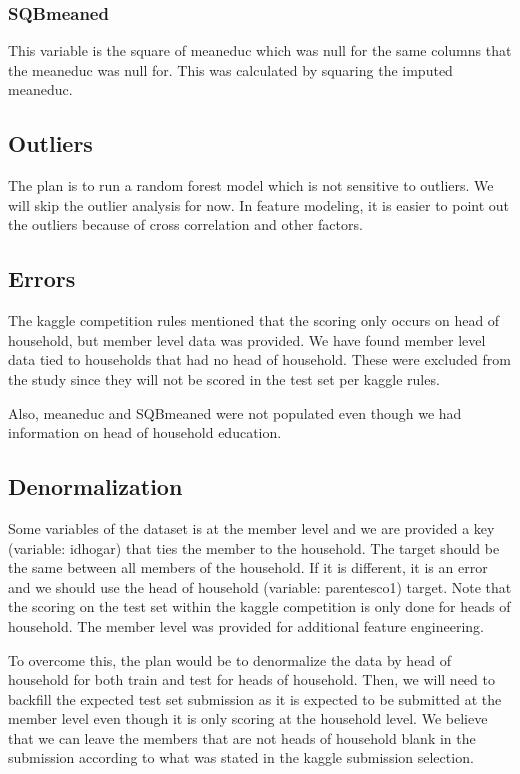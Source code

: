 \documentclass[11pt]{article}
\begin{document}
\subsubsection{SQBmeaned}\label{sqbmeaned}

This variable is the square of meaneduc which was null for the same
columns that the meaneduc was null for. This was calculated by squaring
the imputed meaneduc.

\subsection{Outliers}\label{outliers}

The plan is to run a random forest model which is not sensitive to
outliers. We will skip the outlier analysis for now. In feature
modeling, it is easier to point out the outliers because of cross
correlation and other factors.

\subsection{Errors}\label{errors}

The kaggle competition rules mentioned that the scoring only occurs on
head of household, but member level data was provided. We have found
member level data tied to households that had no head of household.
These were excluded from the study since they will not be scored in the
test set per kaggle rules.

Also, meaneduc and SQBmeaned were not populated even though we had
information on head of household education.

\subsection{Denormalization}\label{denormalization}

Some variables of the dataset is at the member level and we are provided
a key (variable: idhogar) that ties the member to the household. The
target should be the same between all members of the household. If it is
different, it is an error and we should use the head of household
(variable: parentesco1) target. Note that the scoring on the test set
within the kaggle competition is only done for heads of household. The
member level was provided for additional feature engineering.

To overcome this, the plan would be to denormalize the data by head of
household for both train and test for heads of household. Then, we will
need to backfill the expected test set submission as it is expected to
be submitted at the member level even though it is only scoring at the
household level. We believe that we can leave the members that are not
heads of household blank in the submission according to what was stated
in the kaggle submission selection.
\end{document}
